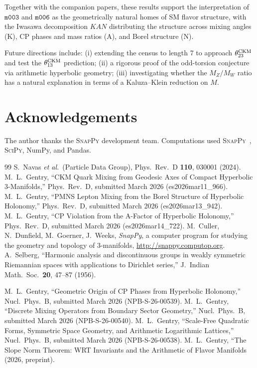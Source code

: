 \documentclass[11pt,a4paper]{article}
\newcommand{\mfld}[1]{\texttt{#1}}
\begin{document}
Together with the companion papers, these results support the interpretation
of $\mfld{m003}$ and $\mfld{m006}$ as the geometrically natural homes of SM
flavor structure, with the Iwasawa decomposition $KAN$ distributing the
structure across mixing angles (K), CP phases and mass ratios (A), and
Borel structure (N).

Future directions include: (i) extending the census to length 7 to approach
$\theta_{23}^{\rm CKM}$ and test the $\theta_{13}^{\rm CKM}$ prediction;
(ii) a rigorous proof of the odd-torsion conjecture via arithmetic hyperbolic
geometry; (iii) investigating whether the $M_Z/M_W$ ratio has a natural
explanation in terms of a Kaluza--Klein reduction on $M$.

\section*{Acknowledgements}
The author thanks the \textsc{SnapPy} development team.
Computations used \textsc{SnapPy}~\cite{SnapPy}, \textsc{SciPy}, NumPy,
and Pandas.

\begin{thebibliography}{99}
  S.~Navas \textit{et al.}\ (Particle Data Group),
  Phys.\ Rev.\ D \textbf{110}, 030001 (2024).
  M.~L.~Gentry,
  ``CKM Quark Mixing from Geodesic Axes of Compact Hyperbolic 3-Manifolds,''
  Phys.\ Rev.\ D, submitted March 2026 (es2026mar11\_966).
  M.~L.~Gentry,
  ``PMNS Lepton Mixing from the Borel Structure of Hyperbolic Holonomy,''
  Phys.\ Rev.\ D, submitted March 2026 (es2026mar13\_942).
  M.~L.~Gentry,
  ``CP Violation from the A-Factor of Hyperbolic Holonomy,''
  Phys.\ Rev.\ D, submitted March 2026 (es2026mar14\_722).
  M.~Culler, N.~Dunfield, M.~Goerner, J.~Weeks,
  \textit{SnapPy}, a computer program for studying the geometry and topology
  of 3-manifolds, \url{http://snappy.computop.org}.
  A.~Selberg,
  ``Harmonic analysis and discontinuous groups in weakly symmetric Riemannian
  spaces with applications to Dirichlet series,''
  J.\ Indian Math.\ Soc.\ \textbf{20}, 47--87 (1956).

  M.~L.~Gentry,
  ``Geometric Origin of CP Phases from Hyperbolic Holonomy,''
  Nucl.\ Phys.\ B, submitted March 2026 (NPB-S-26-00539).
  M.~L.~Gentry,
  ``Discrete Mixing Operators from Boundary Sector Geometry,''
  Nucl.\ Phys.\ B, submitted March 2026 (NPB-S-26-00540).
  M.~L.~Gentry,
  ``Scale-Free Quadratic Forms, Symmetric Space Geometry, and Arithmetic
  Logarithmic Lattices,''
  Nucl.\ Phys.\ B, submitted March 2026 (NPB-S-26-00538).
M.~L.~Gentry, ``The Slope Norm Theorem: WRT Invariants and the
Arithmetic of Flavor Manifolds (2026, preprint).
\end{thebibliography}
\end{document}
